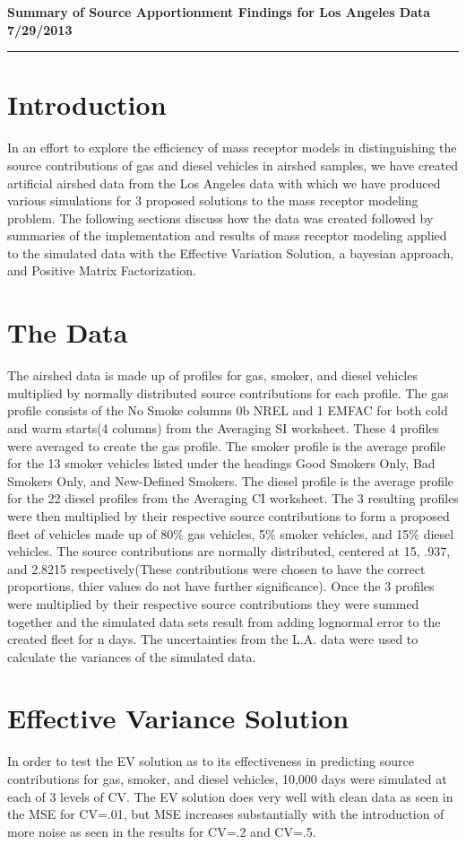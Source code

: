 \documentclass{report}
\begin{document}
{\large\textbf{Summary of Source Apportionment Findings for Los Angeles Data 7/29/2013}} \\ \rule{469pt}{.5pt}
\section*{Introduction}
In an effort to explore the efficiency of mass receptor models in distinguishing the source contributions of gas and diesel vehicles in airshed samples, we have created artificial airshed data from the Los Angeles data with which we have produced various simulations for 3 proposed solutions to the mass receptor modeling problem.  The following sections discuss how the data was created followed by summaries of the implementation and results of mass receptor modeling applied to the simulated data with the Effective Variation Solution, a bayesian approach, and Positive Matrix Factorization.

\section*{The Data}
The airshed data is made up of profiles for gas, smoker, and diesel vehicles multiplied by normally distributed source contributions for each profile. The gas profile consists of the No Smoke columns 0b NREL and 1 EMFAC for both cold and warm starts(4 columns) from the Averaging SI worksheet. These 4 profiles were averaged to create the gas profile.  The smoker profile is the average profile for the 13 smoker vehicles listed under the headings  Good Smokers Only, Bad Smokers Only, and New-Defined Smokers.  The diesel profile is the average profile for the 22 diesel profiles from the Averaging CI worksheet. The 3 resulting profiles were then multiplied by their respective source contributions to form a proposed fleet of vehicles made up of 80\% gas vehicles, 5\% smoker vehicles, and 15\% diesel vehicles. The source contributions are normally distributed, centered at 15, .937, and 2.8215 respectively(These contributions were chosen to have the correct proportions, thier values do not have further significance).  Once the 3 profiles were multiplied by their respective source contributions they were summed together and the simulated data sets result from adding lognormal error to the created fleet for n days.  The uncertainties from the L.A. data were used to calculate the variances of the simulated data.  

\section*{Effective Variance Solution}
 In order to test the EV solution as to its effectiveness in predicting source contributions for gas, smoker, and diesel vehicles, 10,000 days were simulated at each of 3 levels of CV.  The EV solution does very well with clean data as seen in the MSE for CV=.01, but MSE increases substantially with the introduction of more noise as seen in the results for CV=.2 and CV=.5.
\end{document}
